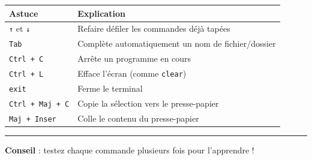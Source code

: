 \begin{center}
	\begin{tabular}{|l|l|}
		\hline
		Astuce                   & Explication                                        \\
		\hline
		\texttt{↑} et \texttt{↓} & Refaire défiler les commandes déjà tapées          \\
		\texttt{Tab}             & Complète automatiquement un nom de fichier/dossier \\
		\texttt{Ctrl + C}        & Arrête un programme en cours                       \\
		\texttt{Ctrl + L}        & Efface l’écran (comme \texttt{clear})              \\
		\texttt{exit}            & Ferme le terminal                                  \\
		\texttt{Ctrl + Maj + C}  & Copie la sélection vers le presse-papier           \\
		\texttt{Maj + Inser}     & Colle le contenu du presse-papier                  \\
		\hline
	\end{tabular}
\end{center}
\hrule
\textbf{Conseil} : testez chaque commande plusieurs fois pour l’apprendre !